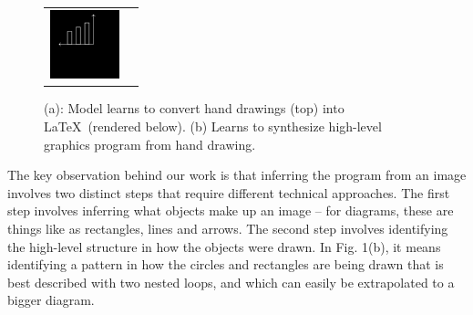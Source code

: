 \documentclass{article}
\newcommand{\exampleImageSize}{2cm}
\theoremstyle{definition}
\begin{document}
\begin{figure}[H]
\begin{minipage}[b]{0.35\linewidth}
\begin{tabular}{ll}
    \includegraphics[width = \exampleImageSize]{figures/58.png}
\end{tabular}
\subcaption{}
  \end{minipage}
  \begin{minipage}[b]{0.6\linewidth}\centering
    \subcaption{}
  \end{minipage}
  \caption{(a): Model learns to convert hand drawings (top) into \LaTeX~(rendered below). (b) Learns to synthesize high-level graphics program from hand drawing.}\label{firstPageExamples}
\end{figure}
 
 The key observation behind our work is that inferring the program from an image involves two distinct steps that require different technical approaches. The first step involves inferring what objects make up an image -- for diagrams, these are things like as rectangles, lines and arrows. The second step involves identifying the high-level structure in how the objects were drawn. In Fig. 1(b), it means identifying a pattern in how the circles and rectangles are being drawn that is best described with two nested loops, and which can easily be extrapolated to a bigger diagram.
\end{document}
